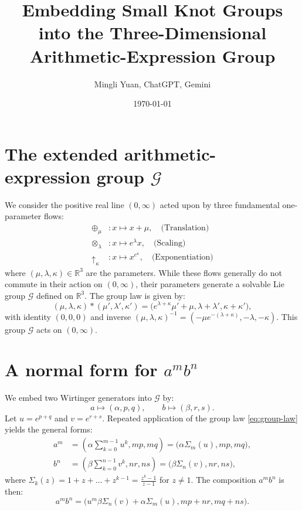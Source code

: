 \documentclass{article}
\title{Embedding Small Knot Groups into the Three-Dimensional Arithmetic-Expression Group}
\author{Mingli Yuan, ChatGPT, Gemini}
\date{\today}
\begin{document}
\maketitle

\section{The extended arithmetic-expression group $\mathcal{G}$}
We consider the positive real line $(0,\infty)$ acted upon by three fundamental one-parameter flows:
\begin{align}
\oplus_{\mu} &: x \mapsto x+\mu, \quad \text{(Translation)}\\
\otimes_{\lambda} &: x \mapsto e^{\lambda}x, \quad \text{(Scaling)}\\
\uparrow_{\kappa} &: x \mapsto x^{e^{\kappa}}, \quad \text{(Exponentiation)}
\end{align}
where $(\mu,\lambda,\kappa)\in\mathbb{R}^{3}$ are the parameters. While these flows generally do not commute in their action on $(0,\infty)$, their parameters generate a solvable Lie group $\mathcal{G}$ defined on $\mathbb{R}^3$. The group law is given by:
\begin{equation}
\label{eq:group-law}
(\mu,\lambda,\kappa)*(\mu',\lambda',\kappa') = \bigl(e^{\lambda+\kappa}\mu'+\mu, \lambda+\lambda', \kappa+\kappa'\bigr),
\end{equation}
with identity $(0,0,0)$ and inverse $(\mu,\lambda,\kappa)^{-1}=(-\mu e^{-(\lambda+\kappa)},-\lambda,-\kappa)$. This group $\mathcal{G}$ acts on $(0,\infty)$.

\section{A normal form for $a^{m}b^{n}$}
We embed two Wirtinger generators into $\mathcal{G}$ by:
\begin{equation}
a \longmapsto (\alpha, p, q), \qquad
b \longmapsto (\beta, r, s).
\end{equation}
Let $u = e^{p+q}$ and $v = e^{r+s}$. Repeated application of the group law \eqref{eq:group-law} yields the general forms:
\begin{align}
a^{m} &= \left(\alpha \sum_{k=0}^{m-1} u^k, mp, mq\right) = \bigl(\alpha\Sigma_{m}(u), mp, mq\bigr), \\
b^{n} &= \left(\beta \sum_{k=0}^{n-1} v^k, nr, ns\right) = \bigl(\beta\Sigma_{n}(v), nr, ns\bigr),
\end{align}
where $\Sigma_{k}(z)=1+z+\dots+z^{k-1} = \frac{z^k-1}{z-1}$ for $z \neq 1$.
The composition $a^m b^n$ is then:
\begin{equation}
\label{eq:am-bn}
a^{m}b^{n}=\bigl(u^m \beta\Sigma_{n}(v) + \alpha\Sigma_{m}(u), mp+nr, mq+ns\bigr).
\end{equation}
\end{document}
